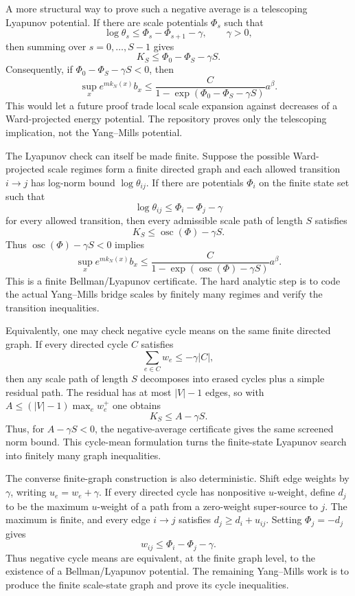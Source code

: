 A more structural way to prove such a negative average is a telescoping
Lyapunov potential. If there are scale potentials $\Phi_s$ such that
\[
  \log\theta_s\leq \Phi_s-\Phi_{s+1}-\gamma,\qquad \gamma>0,
\]
then summing over $s=0,\ldots,S-1$ gives
\[
  K_S\leq \Phi_0-\Phi_S-\gamma S .
\]
Consequently, if $\Phi_0-\Phi_S-\gamma S<0$, then
\[
  \sup_x e^{m k_N(x)} b_x
  \leq
  \frac{C}{1-\exp(\Phi_0-\Phi_S-\gamma S)}a^\beta .
\]
This would let a future proof trade local scale expansion against decreases
of a Ward-projected energy potential. The repository proves only the
telescoping implication, not the Yang--Mills potential.

The Lyapunov check can itself be made finite. Suppose the possible
Ward-projected scale regimes form a finite directed graph and each allowed
transition $i\to j$ has log-norm bound $\log\theta_{ij}$. If there are
potentials $\Phi_i$ on the finite state set such that
\[
  \log\theta_{ij}\leq \Phi_i-\Phi_j-\gamma
\]
for every allowed transition, then every admissible scale path of length $S$
satisfies
\[
  K_S\leq \operatorname{osc}(\Phi)-\gamma S .
\]
Thus $\operatorname{osc}(\Phi)-\gamma S<0$ implies
\[
  \sup_x e^{m k_N(x)}b_x
  \leq
  \frac{C}{1-\exp(\operatorname{osc}(\Phi)-\gamma S)}a^\beta .
\]
This is a finite Bellman/Lyapunov certificate. The hard analytic step is to
code the actual Yang--Mills bridge scales by finitely many regimes and verify
the transition inequalities.

Equivalently, one may check negative cycle means on the same finite directed
graph. If every directed cycle $C$ satisfies
\[
  \sum_{e\in C} w_e\leq-\gamma |C|,
\]
then any scale path of length $S$ decomposes into erased cycles plus a simple
residual path. The residual has at most $|V|-1$ edges, so with
$A\leq(|V|-1)\max_e w_e^+$ one obtains
\[
  K_S\leq A-\gamma S .
\]
Thus, for $A-\gamma S<0$, the negative-average certificate gives the same
screened norm bound. This cycle-mean formulation turns the finite-state
Lyapunov search into finitely many graph inequalities.

The converse finite-graph construction is also deterministic. Shift edge
weights by $\gamma$, writing $u_e=w_e+\gamma$. If every directed cycle has
nonpositive $u$-weight, define $d_j$ to be the maximum $u$-weight of a path
from a zero-weight super-source to $j$. The maximum is finite, and every edge
$i\to j$ satisfies $d_j\geq d_i+u_{ij}$. Setting $\Phi_j=-d_j$ gives
\[
  w_{ij}\leq \Phi_i-\Phi_j-\gamma .
\]
Thus negative cycle means are equivalent, at the finite graph level, to the
existence of a Bellman/Lyapunov potential. The remaining Yang--Mills work is
to produce the finite scale-state graph and prove its cycle inequalities.

